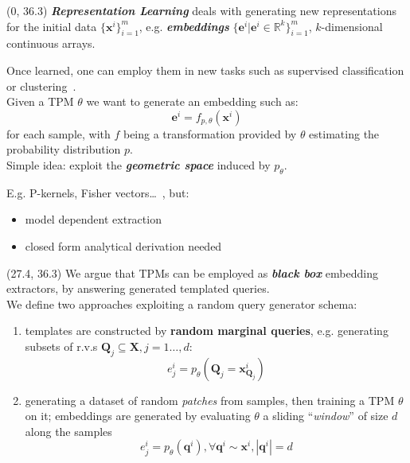 \documentclass[final]{beamer}
\begin{document}
\begin{frame}{}
  \begin{textblock}{25.2}(0, 36.3)
    \small
    \textbf{\emph{Representation Learning}} deals with generating new
    representations for the initial data $\{\mathbf x^i\}_{i=1}^m$,
    e.g. \textbf{\emph{embeddings}}
    $\{\mathbf{e}^i|\mathbf{e}^i\in\mathbb{R}^{k}\}_{i=1}^m $,
    $k$-dimensional continuous arrays.\par
    Once learned, one can employ them in new tasks such as
    supervised classification or
    clustering~\parencite{Bengio2012}.\\[20pt]

    Given a TPM $\theta$ we want to generate an embedding such as:
    $$\mathbf{e}^{i}=f_{p,\theta}(\mathbf{x}^{i})$$
    for each sample, with $f$ being a transformation provided by $\theta$ estimating the
    probability distribution $p$.\\[20pt]

    Simple idea: exploit the \textbf{\emph{geometric space}} induced by $p_{\theta}$.\par
    E.g. P-kernels, Fisher vectors\dots~\parencite{Shawe-Taylor2004},
    but:
    \begin{itemize}
    \item model dependent extraction
      \item closed form analytical derivation needed
    \end{itemize}
    
  \end{textblock}
  
  \begin{textblock}{25.2}(27.4, 36.3)
    \small
    We argue that TPMs can be employed as \textbf{\emph{black box}} embedding
    extractors, by answering generated templated
    queries.\\[20pt]

    We define two approaches exploiting a random query generator
    schema:
    \begin{enumerate}[I]
    \item templates are constructed by \textbf{random marginal
      queries}, e.g. generating subsets of r.v.s $\mathbf{Q}_{j} \subseteq
    \mathbf{X}, j = 1\dots,d$:
    $$e_{j}^{i}=p_{\theta}(\mathbf{Q}_{j}=\mathbf{x}^{i}_{\mathbf{Q}_{j}})$$
  \item generating a dataset of random \emph{patches} from samples,
    then training a TPM $\theta$ on it; embeddings are generated by evaluating $\theta$
    a sliding ``\emph{window}'' of size $d$ along the samples
    $$e_{j}^{i}=p_{\theta}(\mathbf{q}^{i}),\forall \mathbf{q}^{i}\sim \mathbf{x}^{i}, |\mathbf{q}^{i}|=d$$
  \end{enumerate}\vspace{20pt}


\end{textblock}
\end{frame}
\end{document}
